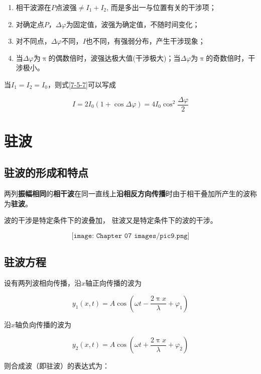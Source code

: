 \documentclass[
	12pt, %
	a4paper, %
]{myLegrandOrangeBook}
\begin{document}
    \begin{enumerate}
        \item 相干波源在\(P\)点波强\(\neq I_1+I_2\), 而是多出一与位置有关的干涉项；
        \item 对确定点\( P\)，\(\Delta \varphi\)为固定值，波强为确定值，不随时间变化；
        \item 对不同点，\(\Delta \varphi\)不同，\(I\)也不同，有强弱分布，产生干涉现象；
        \item 当\(\Delta \varphi\)为\(\uppi\)的偶数倍时，波强达极大值(干涉极大)；当\(\Delta \varphi\)为\(\uppi\)的奇数倍时，干涉极小。
    \end{enumerate}

    当\(I_1=I_2=I_0\)，则式\ref{7-5-7}可以写成

    \begin{equation}
        I=2 I_0(1+\cos \Delta \varphi)=4 I_0 \cos ^2 \frac{\Delta \varphi}{2}
    \end{equation}

\section{驻波}

\subsection{驻波的形成和特点}

    两列\textbf{振幅相同}的\textbf{相干波}在同一直线上\textbf{沿相反方向传播}时由于相干叠加所产生的波称为\textbf{驻波}。

    波的干涉是特定条件下的波叠加， 驻波又是特定条件下的波的干涉。

    \[
        \texttt{[image: Chapter 07 images/pic9.png]}
    \]

\subsection{驻波方程}

    设有两列波相向传播，沿\(x\)轴正向传播的波为

    $$
        y_1(x, t)=A \cos \left(\omega t-\frac{2 \uppi x}{\lambda}+\varphi_1\right)
    $$

    沿\(x\)轴负向传播的波为

    $$
        y_2(x, t)=A \cos \left(\omega t+\frac{2 \uppi x}{\lambda}+\varphi_2\right)
    $$

    则合成波（即驻波）的表达式为：
\end{document}
